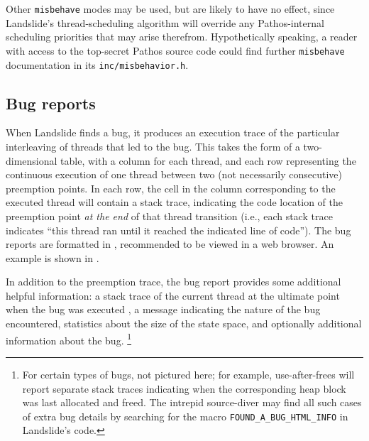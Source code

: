 Other {\tt misbehave} modes may be used, but are likely to have no effect,
since Landslide's thread-scheduling algorithm will override
any Pathos-internal scheduling priorities that may arise therefrom.
Hypothetically speaking, a reader with access to the top-secret Pathos source code
could find further {\tt misbehave} documentation in its {\tt inc/misbehavior.h}.


\subsection{Bug reports}
\label{sec:landslide-bugreport}

When Landslide finds a bug, it produces an execution trace of the particular interleaving of threads that led to the bug.
This takes the form of a two-dimensional table,
with a column for each thread,
and each row representing the continuous execution of one thread between two (not necessarily consecutive) preemption points.
In each row, the cell in the column corresponding to the executed thread will contain a stack trace,
indicating the code location of the preemption point {\em at the end} of that thread transition
(i.e., each stack trace indicates ``this thread ran until it reached the indicated line of code'').
The bug reports are formatted in , recommended to be viewed in a web browser.
An example is shown in .

In addition to the preemption trace, the bug report provides some additional helpful information:
a stack trace of the current thread at the ultimate point when the bug was executed
,
a message indicating the nature of the bug encountered,
statistics about the size of the state space,
and optionally additional information about the bug.%
\footnote{For certain types of bugs, not pictured here;
for example, use-after-frees will report separate stack traces
indicating when the corresponding heap block was last allocated and freed.
The intrepid source-diver may find all such cases of extra bug details
by searching for the macro {\tt FOUND\_A\_BUG\_HTML\_INFO} in Landslide's code.}

